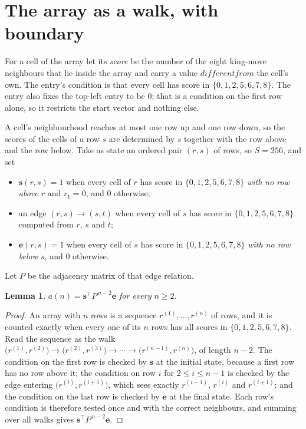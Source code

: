 \documentclass[11pt,a4paper]{article}
\theoremstyle{plain}
\newtheorem{lemma}[theorem]{Lemma}
\theoremstyle{definition}
\begin{document}
\section{The array as a walk, with boundary}

For a cell of the array let its \emph{score} be the number of the eight king-move neighbours that lie inside
the array and carry a value $different from$ the cell's own. The entry's condition is that every cell
has score in $\{0,1,2,5,6,7,8\}$. The entry also fixes the top-left entry to be $0$; that is a condition on the first row alone, so it restricts the start vector and nothing else.

A cell's neighbourhood reaches at most one row up and one row down, so the scores of the
cells of a row $s$ are determined by $s$ together with the row above and the row below.
Take as state an ordered pair $(r,s)$ of rows, so $S=256$, and set
\begin{itemize}
\item $\mathbf{s}(r,s)=1$ when every cell of $r$ has score in $\{0,1,2,5,6,7,8\}$ \emph{with no row
above $r$} and $r_1=0$, and $0$ otherwise;
\item an edge $(r,s)\to(s,t)$ when every cell of $s$ has score in $\{0,1,2,5,6,7,8\}$ computed from
$r$, $s$ and $t$;
\item $\mathbf{e}(r,s)=1$ when every cell of $s$ has score in $\{0,1,2,5,6,7,8\}$ \emph{with no row
below $s$}, and $0$ otherwise.
\end{itemize}
Let $P$ be the adjacency matrix of that edge relation.

\begin{lemma}\label{lem:walk}
$a(n)=\mathbf{s}^{\!\top}P^{\,n-2}\mathbf{e}$ for every $n\ge2$.
\end{lemma}

\begin{proof}
An array with $n$ rows is a sequence $r^{(1)},\dots,r^{(n)}$ of rows, and it is counted
exactly when every one of its $n$ rows has all scores in $\{0,1,2,5,6,7,8\}$. Read the sequence as the
walk $\bigl(r^{(1)},r^{(2)}\bigr)\to\bigl(r^{(2)},r^{(3)}\bigr)\to\cdots\to
\bigl(r^{(n-1)},r^{(n)}\bigr)$, of length $n-2$. The condition on the first row is
checked by $\mathbf{s}$ at the initial state, because a first row has no row above it; the
condition on row $i$ for $2\le i\le n-1$ is checked by the edge entering
$\bigl(r^{(i)},r^{(i+1)}\bigr)$, which sees exactly $r^{(i-1)}$, $r^{(i)}$ and
$r^{(i+1)}$; and the condition on the last row is checked by $\mathbf{e}$ at the final
state. Each row's condition is therefore tested once and with the correct neighbours, and
summing over all walks gives $\mathbf{s}^{\!\top}P^{\,n-2}\mathbf{e}$.
\end{proof}
\end{document}
